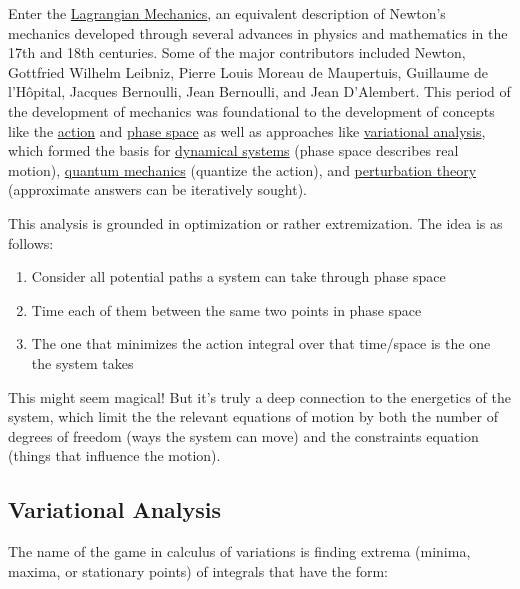 Enter the
\href{https://en.wikipedia.org/wiki/Lagrangian_mechanics}{Lagrangian
Mechanics}, an equivalent description of Newton's mechanics developed
through several advances in physics and mathematics in the 17th and 18th
centuries. Some of the major contributors included Newton, Gottfried
Wilhelm Leibniz, Pierre Louis Moreau de Maupertuis, Guillaume de
l'Hôpital, Jacques Bernoulli, Jean Bernoulli, and Jean D'Alembert. This
period of the development of mechanics was foundational to the
development of concepts like the
\href{https://en.wikipedia.org/wiki/Action_(physics)}{action} and
\href{https://en.wikipedia.org/wiki/Phase_space}{phase space} as well as
approaches like
\href{https://en.wikipedia.org/wiki/Calculus_of_variations}{variational
analysis}, which formed the basis for
\href{https://en.wikipedia.org/wiki/Dynamical_system}{dynamical systems}
(phase space describes real motion),
\href{https://en.wikipedia.org/wiki/Quantum_mechanics}{quantum
mechanics} (quantize the action), and
\href{https://en.wikipedia.org/wiki/Perturbation_theory}{perturbation
theory} (approximate answers can be iteratively sought).

This analysis is grounded in optimization or rather extremization. The
idea is as follows:

\begin{enumerate}
\def\labelenumi{\arabic{enumi}.}
\tightlist
\item
  Consider all potential paths a system can take through phase space
\item
  Time each of them between the same two points in phase space
\item
  The one that minimizes the action integral over that time/space is the
  one the system takes
\end{enumerate}

This might seem magical! But it's truly a deep connection to the
energetics of the system, which limit the the relevant equations of
motion by both the number of degrees of freedom (ways the system can
move) and the constraints equation (things that influence the motion).

\subsection{Variational Analysis}\label{variational-analysis}

The name of the game in calculus of variations is finding extrema
(minima, maxima, or stationary points) of integrals that have the form:

